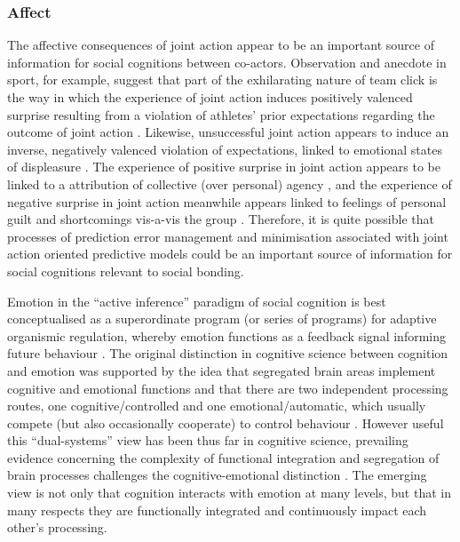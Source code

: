 \begin{CJK}{UTF8}{gbsn}
\subsubsection{Affect}
The affective consequences of joint action appear to be an important source of information for social cognitions between co-actors.  Observation and anecdote in sport, for example, suggest that part of the exhilarating nature of team click is the way in which the experience of joint action induces positively valenced surprise resulting from a violation of athletes' prior expectations regarding the outcome of joint action \citep{Jackson1999}.  Likewise, unsuccessful joint action appears to induce an inverse, negatively valenced violation of expectations, linked to emotional states of displeasure \citep{Ekkekakis2003}.  The experience of positive surprise in joint action appears to be linked to a attribution of collective (over personal) agency \cite{Sato2005,Sato2008}, and the experience of negative surprise in joint action meanwhile appears linked to feelings of personal guilt and shortcomings vis-a-vis the group \citep{Kenworthy2011,Mckimmie2015}.  Therefore, it is quite possible that processes of prediction error management and minimisation associated with joint action oriented predictive models could be an important source of information for social cognitions relevant to social bonding.

Emotion in the ``active inference'' paradigm of social cognition is best conceptualised as a superordinate program (or series of programs) for adaptive organismic regulation, whereby emotion functions as a feedback signal informing future behaviour \citep{Cosmides2000,Chetverikov2014,Chetverikov2015,Barrett2017}.  The original distinction in cognitive science between cognition and emotion was supported by the idea that segregated brain areas implement cognitive and emotional functions and that there are two independent processing routes, one cognitive/controlled and one emotional/automatic, which usually compete (but also occasionally cooperate) to control behaviour \citep{Kahneman2003}.  However useful this ``dual-systems'' view has been thus far in cognitive science, prevailing evidence concerning the complexity of functional integration and segregation of brain processes challenges the cognitive-emotional distinction \citep{Pessoa2013}.  The emerging view is not only that cognition interacts with emotion at many levels, but that in many respects they are functionally integrated and continuously impact each other's processing.


\end{CJK}
